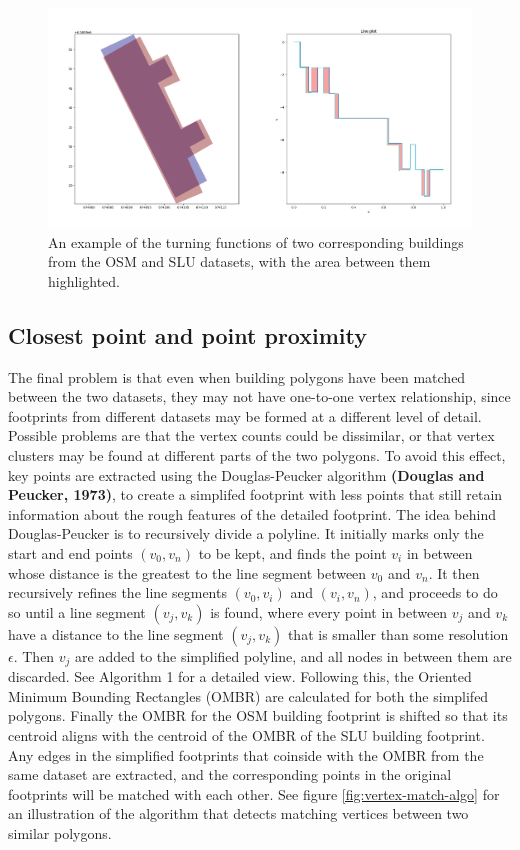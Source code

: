 \documentclass{kththesis}
\begin{document}
\begin{figure}[H]
    \centering
    \includegraphics[width=\textwidth,height=0.5\textheight,keepaspectratio]{img_turn_function_diff_filled}
    \caption{An example of the turning functions of two corresponding buildings from the OSM and SLU datasets, with the area between them highlighted.}
    \label{fig:turning-function-compare}
\end{figure}

\subsection{Closest point and point proximity}

The final problem is that even when building polygons have been matched between the two datasets, they may not have one-to-one vertex relationship, since footprints from different datasets may be formed at a different level of detail.
Possible problems are that the vertex counts could be dissimilar, or that vertex clusters may be found at different parts of the two polygons.
To avoid this effect, key points are extracted using the Douglas-Peucker algorithm \textbf{(Douglas and Peucker, 1973)}, to create a simplifed footprint with less points that still retain information about the rough features of the detailed footprint.
The idea behind Douglas-Peucker is to recursively divide a polyline.
It initially marks only the start and end points $(v_0, v_n)$ to be kept, and finds the point $v_i$ in between whose distance is the greatest to the line segment between $v_0$ and $v_n$.
It then recursively refines the line segments $(v_0, v_i)$ and $(v_i, v_n)$, and proceeds to do so until a line segment $(v_j, v_k)$ is found, where every point in between $v_j$ and $v_k$ have a distance to the line segment $(v_j, v_k)$ that is smaller than some resolution $\epsilon$.
Then $v_j$ are added to the simplified polyline, and all nodes in between them are discarded.
See Algorithm 1 for a detailed view.
Following this, the Oriented Minimum Bounding Rectangles (OMBR) are calculated for both the simplifed polygons.
Finally the OMBR for the OSM building footprint is shifted so that its centroid aligns with the centroid of the OMBR of the SLU building footprint.
Any edges in the simplified footprints that coinside with the OMBR from the same dataset are extracted, and the corresponding points in the original footprints will be matched with each other.
See figure \ref{fig:vertex-match-algo} for an illustration of the algorithm that detects matching vertices between two similar polygons.
\end{document}
